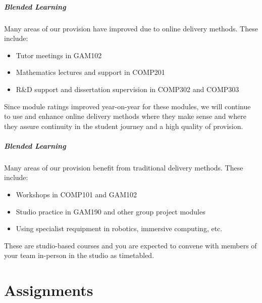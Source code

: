 \begin{frame}
	\frametitle{Blended Learning}
		
	Many areas of our provision have improved due to online delivery methods. These include:
	
	\vspace{0.5em}
	
	\begin{itemize}
		\item Tutor meetings in GAM102
		\item Mathematics lectures and support in COMP201
		\item R\&D support and dissertation supervision in COMP302 and COMP303
	\end{itemize}
	
	\vspace{0.5em}
	
	Since module ratings improved year-on-year for these modules, we will continue to use and enhance online delivery methods where they make sense and where they assure continuity in the student journey and a high quality of provision.
	
\end{frame}

\begin{frame}
	\frametitle{Blended Learning}
		
	Many areas of our provision benefit from traditional delivery methods. These include:
	
	\vspace{0.5em}
	
	\begin{itemize}
		\item Workshops in COMP101 and GAM102
		\item Studio practice in GAM190 and other group project modules
		\item Using specialist requipment in robotics, immersive computing, etc.
	\end{itemize}
	
	\vspace{0.5em}
	
	These are studio-based courses and you are expected to convene with members of your team in-person in the studio as timetabled.
	
\end{frame}

\part{Assignments}
\frame{\partpage}


